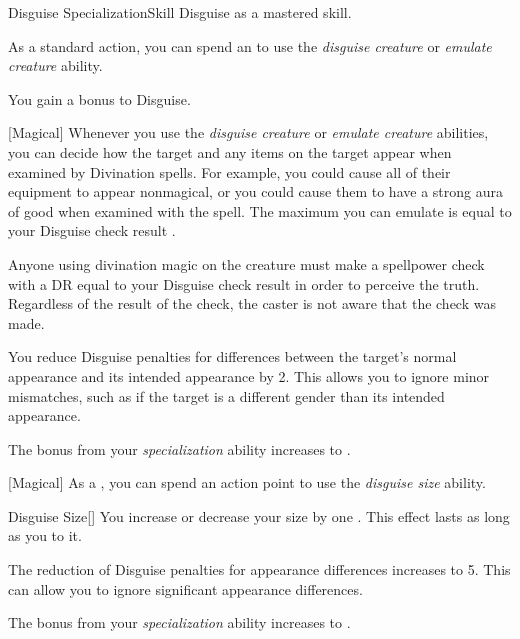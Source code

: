     \begin{feat}{Disguise Specialization}{Skill}
        \featpre Disguise as a mastered skill.

         As a standard action, you can spend an  to use the \textit{disguise creature} or \textit{emulate creature} ability.

         You gain a  bonus to Disguise.

        [Magical] Whenever you use the \textit{disguise creature} or \textit{emulate creature} abilities, you can decide how the target and any items on the target appear when examined by Divination spells.
        For example, you could cause all of their equipment to appear nonmagical, or you could cause them to have a strong aura of good when examined with the  spell.
        The maximum  you can emulate is equal to your Disguise check result .

        Anyone using divination magic on the creature must make a spellpower check with a DR equal to your Disguise check result in order to perceive the truth.
        Regardless of the result of the check, the caster is not aware that the check was made.

         You reduce Disguise penalties for differences between the target's normal appearance and its intended appearance by 2.
        This allows you to ignore minor mismatches, such as if the target is a different gender than its intended appearance.

         The bonus from your \textit{specialization} ability increases to .

        [Magical] As a , you can spend an action point to use the \textit{disguise size} ability.
        \begin{ability}{Disguise Size}[]
            You increase or decrease your size by one .
            This effect lasts as long as you  to it.
        \end{ability}

         The reduction of Disguise penalties for appearance differences increases to 5.
        This can allow you to ignore significant appearance differences.

         The bonus from your \textit{specialization} ability increases to .
    \end{feat}


